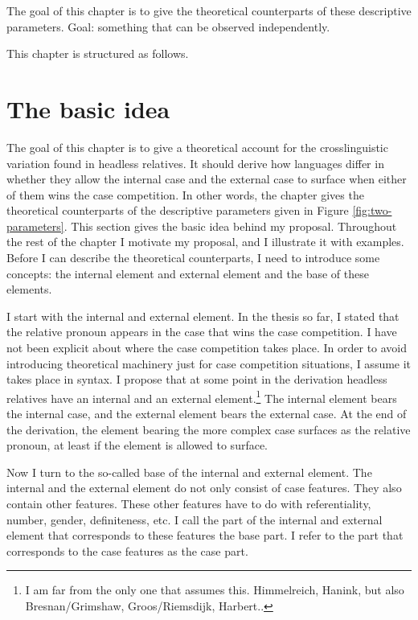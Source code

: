 The goal of this chapter is to give the theoretical counterparts of these descriptive parameters. Goal: something that can be observed independently.

This chapter is structured as follows.


\section{The basic idea}\label{sec:basic-idea}

The goal of this chapter is to give a theoretical account for the crosslinguistic variation found in headless relatives. It should derive how languages differ in whether they allow the internal case and the external case to surface when either of them wins the case competition. In other words, the chapter gives the theoretical counterparts of the descriptive parameters given in Figure \ref{fig:two-parameters}. This section gives the basic idea behind my proposal. Throughout the rest of the chapter I motivate my proposal, and I illustrate it with examples. Before I can describe the theoretical counterparts, I need to introduce some concepts: the internal element and external element and the base of these elements.

I start with the internal and external element. In the thesis so far, I stated that the relative pronoun appears in the case that wins the case competition. I have not been explicit about where the case competition takes place. In order to avoid introducing theoretical machinery just for case competition situations, I assume it takes place in syntax. I propose that at some point in the derivation headless relatives have an internal and an external element.\footnote{
I am far from the only one that assumes this. Himmelreich, Hanink, but also Bresnan/Grimshaw, Groos/Riemsdijk, Harbert..
} The internal element bears the internal case, and the external element bears the external case. At the end of the derivation, the element bearing the more complex case surfaces as the relative pronoun, at least if the element is allowed to surface.

Now I turn to the so-called base of the internal and external element. The internal and the external element do not only consist of case features. They also contain other features. These other features have to do with referentiality, number, gender, definiteness, etc. I call the part of the internal and external element that corresponds to these features the base part. I refer to the part that corresponds to the case features as the case part.

